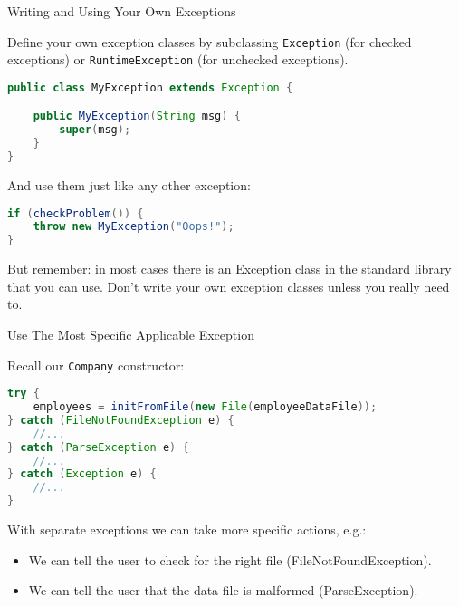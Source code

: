 \documentclass{beamer}
\begin{document}
\begin{frame}[fragile]{Writing and Using Your Own Exceptions}


Define your own exception classes by subclassing {\tt Exception} (for checked exceptions) or {\tt RuntimeException} (for unchecked exceptions).

\begin{lstlisting}[language=Java]
public class MyException extends Exception {

    public MyException(String msg) {
        super(msg);
    }
}
\end{lstlisting}
And use them just like any other exception:
\begin{lstlisting}[language=Java]
if (checkProblem()) {
    throw new MyException("Oops!");
}
\end{lstlisting}

But remember: in most cases there is an Exception class in the standard library that you can use. Don't write your own exception classes unless you really need to.

\end{frame}

\begin{frame}[fragile]{Use The Most Specific Applicable Exception}


Recall our {\tt Company} constructor:
\begin{lstlisting}[language=Java]
try {
    employees = initFromFile(new File(employeeDataFile));
} catch (FileNotFoundException e) {
    //...
} catch (ParseException e) {
    //...
} catch (Exception e) {
    //...
}
\end{lstlisting}
With separate exceptions we can take more specific actions, e.g.:
\begin{itemize}
\item We can tell the user to check for the right file (FileNotFoundException).
\item We can tell the user that the data file is malformed (ParseException).
\end{itemize}


\end{frame}
\end{document}
